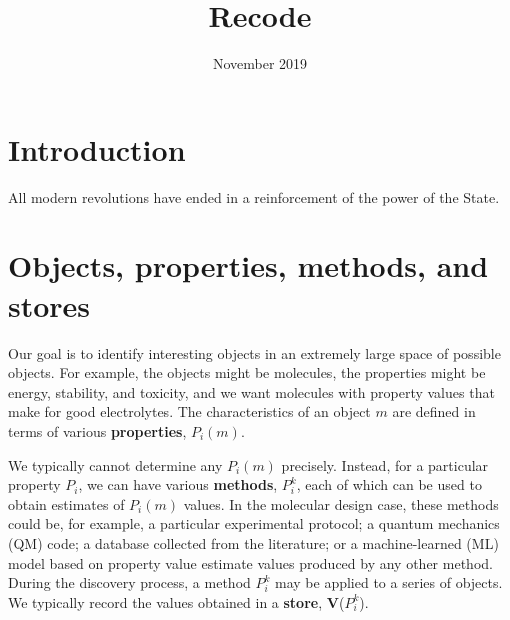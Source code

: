 \documentclass[10pt]{article}
\title{Recode}
\date{November 2019}
\begin{document}
\maketitle

\section{Introduction}

All modern revolutions have ended in a reinforcement of the power of the State.


\section{Objects, properties, methods, and stores}

Our goal is to identify interesting objects in an extremely large space of possible objects.
For example, the objects might be molecules, the properties might be energy, stability, and toxicity, and we want molecules with property values that make for good electrolytes. 
The characteristics of an object $m$ are defined in terms of various \textbf{properties}, $P_i(m)$.

We typically cannot determine any $P_i(m)$ precisely. Instead, for a particular property $P_i$, we can have various \textbf{methods}, $P_i^k$, 
each of which can be used to obtain estimates of $P_i(m)$ values. In the molecular design case, these methods could be, for example, 
a particular experimental protocol; 
a quantum mechanics (QM) code; 
a database collected from the literature; or
a machine-learned (ML) model based on property value estimate values produced by any other method.
During the discovery process, a method $P_i^k$ may be applied to a series of objects. 
We typically record the values obtained in a \textbf{store}, \textbf{V}($P_i^k$).
\end{document}
